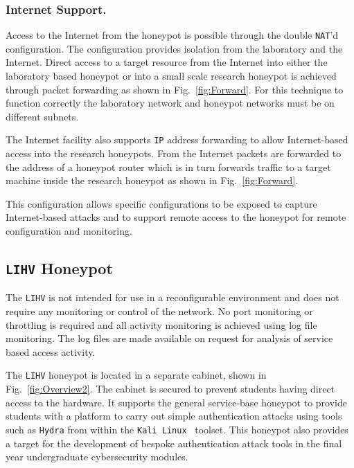 \documentclass{llncs}
\begin{document}
\subsubsection{Internet Support.}

Access to the Internet from the honeypot is possible through the double
\texttt{NAT}'d configuration. The configuration provides isolation from the
laboratory and the Internet. Direct access to a target resource from the
Internet into either the laboratory based honeypot or into a small scale
research honeypot is achieved through packet forwarding as shown in
Fig.~\ref{fig:Forward}. For this technique to function correctly the
laboratory network and honeypot networks must be on different subnets.

The Internet facility also supports \texttt{IP} address forwarding to allow
Internet-based access into the research honeypots. From the Internet packets
are forwarded to the address of a honeypot router which is in turn forwards
traffic to a target machine inside the research honeypot as shown in
Fig.~\ref{fig:Forward}.

This configuration allows specific configurations to be exposed to capture
Internet-based attacks and to support remote access to the honeypot for remote
configuration and monitoring.

\subsection{\texttt{LIHV} Honeypot}

The \texttt{LIHV} is not intended for use in a reconfigurable environment and
does not require any monitoring or control of the network. No port monitoring
or throttling is required and all activity monitoring is achieved using log
file monitoring. The log files are made available on request for analysis of
service based access activity.

The \texttt{LIHV} honeypot is located in a separate cabinet, shown in
Fig.~\ref{fig:Overview2}. The cabinet is secured to prevent students having
direct access to the hardware. It supports the general service-base honeypot to
provide students with a platform to carry out simple authentication attacks
using tools such as \texttt{Hydra} from within the \texttt{Kali
Linux}~\cite{OS:17} toolset. This honeypot also provides a target for the
development of bespoke authentication attack tools in the final year
undergraduate cybersecurity modules.
\end{document}

